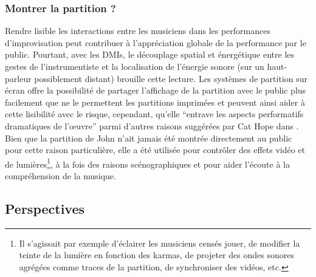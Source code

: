 \subsubsection{Montrer la partition ?}

\noindent Rendre lisible les interactions entre les musiciens dans les performances d'improvisation peut contribuer à l'appréciation globale de la performance par le public. Pourtant, avec les \glspl{DMI}, le découplage spatial et énergétique entre les gestes de l'instrumentiste et la localisation de l'énergie sonore (sur un haut-parleur possiblement distant) brouille cette lecture. Les systèmes de partition sur écran offre la possibilité de partager l'affichage de la partition avec le public plus facilement que ne le permettent les partitions imprimées et peuvent ainsi aider à cette lisibilité avec le risque, cependant, qu'elle ``entrave les aspects performatifs dramatiques de l'œuvre'' parmi d'autres raisons suggérées par Cat Hope dans \cite{hope_screen_2011}.\\
\indent Bien que la partition de John n'ait jamais été montrée directement au public pour cette raison particulière, elle a été utilisée pour contrôler des effets vidéo et de lumières\footnote{Il s'agissait par exemple d'éclairer les musiciens censés jouer, de modifier la teinte de la lumière en fonction des karmas, de projeter des ondes sonores agrégées comme traces de la partition, de synchroniser des vidéos, etc.}, à la fois des raisons scénographiques et pour aider l'écoute à la compréhension de la musique.

\subsection{Perspectives}

